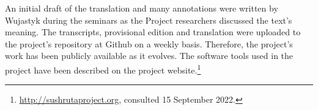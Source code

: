 An initial draft of the translation and many annotations were written by  
Wujastyk during the seminars as the Project researchers discussed the text's 
meaning. The transcripts, provisional edition and translation were uploaded to the 
project's repository at Github on a weekly basis. Therefore, the project's work has 
been publicly available as it evolves. The software tools used in the project have been 
described on the project website.\footnote{\url{http://sushrutaproject.org}, consulted
    15 September 2022.}

%    
%    
%    

